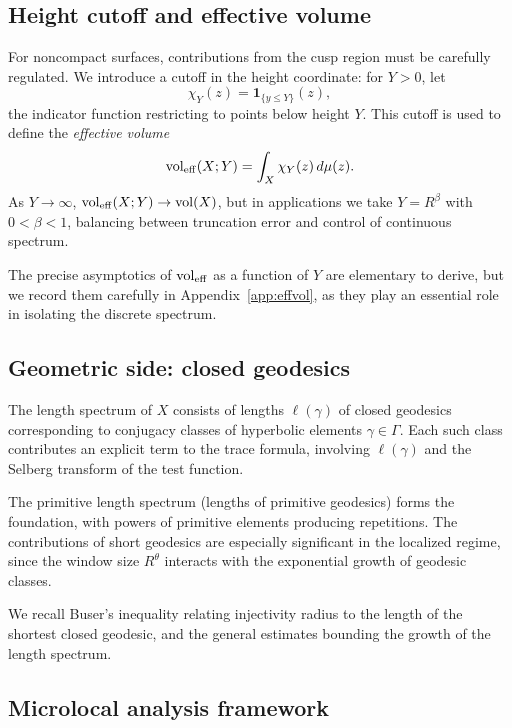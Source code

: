 \subsection{Height cutoff and effective volume}\label{subsec:cutoff}

For noncompact surfaces, contributions from the cusp region must be carefully regulated. We introduce a cutoff in the height coordinate: for $Y > 0$, let
\[
\chi_Y(z) = \mathbf{1}_{\{ y \leq Y\}}(z),
\]
the indicator function restricting to points below height $Y$. This cutoff is used to define the \emph{effective volume}
\[
\operatorname{vol}_{\mathrm{eff}}(X;Y) = \int_{X} \chi_Y(z)\, d\mu(z).
\]
As $Y\to\infty$, $\operatorname{vol}_{\mathrm{eff}}(X;Y) \to \operatorname{vol}(X)$, but in applications we take $Y = R^\beta$ with $0<\beta<1$, balancing between truncation error and control of continuous spectrum.

The precise asymptotics of $\operatorname{vol}_{\mathrm{eff}}$ as a function of $Y$ are elementary to derive, but we record them carefully in Appendix~\ref{app:effvol}, as they play an essential role in isolating the discrete spectrum.

\subsection{Geometric side: closed geodesics}\label{subsec:geodesics}

The length spectrum of $X$ consists of lengths $\ell(\gamma)$ of closed geodesics corresponding to conjugacy classes of hyperbolic elements $\gamma \in \Gamma$. Each such class contributes an explicit term to the trace formula, involving $\ell(\gamma)$ and the Selberg transform of the test function.

The primitive length spectrum (lengths of primitive geodesics) forms the foundation, with powers of primitive elements producing repetitions. The contributions of short geodesics are especially significant in the localized regime, since the window size $R^\theta$ interacts with the exponential growth of geodesic classes.

We recall Buser’s inequality relating injectivity radius to the length of the shortest closed geodesic, and the general estimates bounding the growth of the length spectrum.

\subsection{Microlocal analysis framework}\label{subsec:microlocal}

